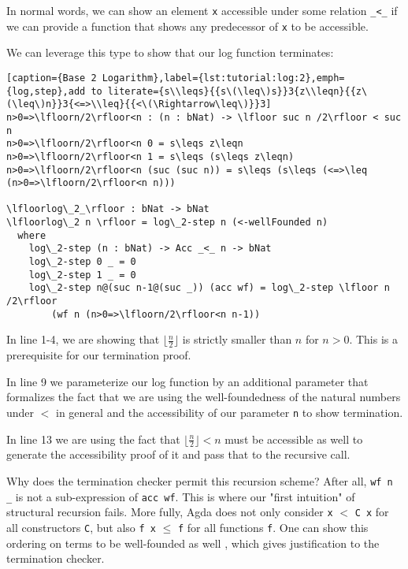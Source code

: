 In normal words, we can show an element \texttt{x} accessible under some relation \texttt{\_<\_} if we can provide a function that shows any predecessor of \texttt{x} to be accessible.

We can leverage this type to show that our log function terminates:

\begin{lstlisting}[caption={Base 2 Logarithm},label={lst:tutorial:log:2},emph={log,step},add to literate={s\\leqs}{{s\(\leq\)s}}3{z\\leqn}{{z\(\leq\)n}}3{<=>\\leq}{{<\(\Rightarrow\leq\)}}3]
n>0=>\lfloorn/2\rfloor<n : (n : bNat) -> \lfloor suc n /2\rfloor < suc n
n>0=>\lfloorn/2\rfloor<n 0 = s\leqs z\leqn
n>0=>\lfloorn/2\rfloor<n 1 = s\leqs (s\leqs z\leqn)
n>0=>\lfloorn/2\rfloor<n (suc (suc n)) = s\leqs (s\leqs (<=>\leq (n>0=>\lfloorn/2\rfloor<n n)))

\lfloorlog\_2_\rfloor : bNat -> bNat
\lfloorlog\_2 n \rfloor = log\_2-step n (<-wellFounded n)
  where
    log\_2-step (n : bNat) -> Acc _<_ n -> bNat
    log\_2-step 0 _ = 0
    log\_2-step 1 _ = 0
    log\_2-step n@(suc n-1@(suc _)) (acc wf) = log\_2-step \lfloor n /2\rfloor
        (wf n (n>0=>\lfloorn/2\rfloor<n n-1))
\end{lstlisting}

In line 1-4, we are showing that $\lfloor \frac n 2 \rfloor$ is strictly smaller than $n$ for $n > 0$. This is a prerequisite for our termination proof.

In line 9 we parameterize our log function by an additional parameter that formalizes the fact that we are using the well-foundedness of the natural numbers under $<$ in general and the accessibility of our parameter \texttt{n} to show termination.

In line 13 we are using the fact that $\lfloor \frac n 2 \rfloor < n$ must be accessible as well to generate the accessibility proof of it and pass that to the recursive call.

Why does the termination checker permit this recursion scheme? After all, \texttt{wf n \_} is not a sub-expression of \texttt{acc wf}. This is where our "first intuition" of structural recursion fails. More fully, Agda does not only consider \texttt{x} $<$ \texttt{C x} for all constructors \texttt{C}, but also \texttt{f x} $\leq$ \texttt{f} for all functions \texttt{f}. One can show this ordering on terms to be well-founded as well \cite{abel:2002:predicative-analysis-structural-recursion}, which gives justification to the termination checker.


